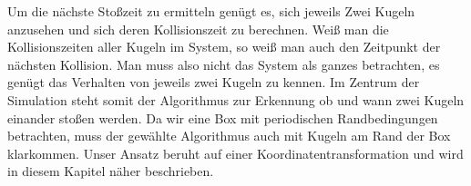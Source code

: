 
\newcommand{\reffig}[1]{Abbildung \ref{fig:#1}}

Um die nächste Stoßzeit zu ermitteln genügt es, sich jeweils Zwei Kugeln anzusehen und sich deren Kollisionszeit zu berechnen. Weiß man die Kollisionszeiten aller Kugeln im System, so weiß man auch den Zeitpunkt der nächsten Kollision. Man muss also nicht das System als ganzes betrachten, es genügt das Verhalten von jeweils zwei Kugeln zu kennen.
Im Zentrum der Simulation steht somit der Algorithmus zur Erkennung ob und wann zwei Kugeln einander stoßen werden. 
Da wir eine Box mit periodischen Randbedingungen betrachten, muss der gewählte Algorithmus auch mit Kugeln am Rand der Box klarkommen. Unser Ansatz beruht auf einer Koordinatentransformation und wird in diesem Kapitel näher beschrieben.





